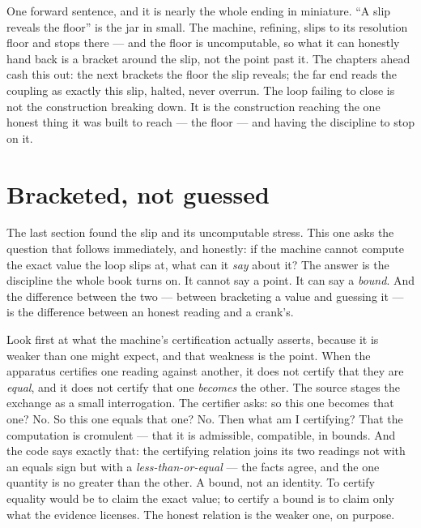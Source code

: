 One forward sentence, and it is nearly the whole ending in miniature. ``A slip reveals the floor'' is the jar in
small. The machine, refining, slips to its resolution floor and stops there --- and the floor is uncomputable, so what
it can honestly hand back is a bracket around the slip, not the point past it. The chapters ahead cash this out: the
next brackets the floor the slip reveals; the far end reads the coupling as exactly this slip, halted, never overrun.
The loop failing to close is not the construction breaking down. It is the construction reaching the one honest thing
it was built to reach --- the floor --- and having the discipline to stop on it.

\section{Bracketed, not guessed}

The last section found the slip and its uncomputable stress. This one asks the question that follows immediately, and
honestly: if the machine cannot compute the exact value the loop slips at, what can it \emph{say} about it? The answer
is the discipline the whole book turns on. It cannot say a point. It can say a \emph{bound}. And the difference between
the two --- between bracketing a value and guessing it --- is the difference between an honest reading and a crank's.

Look first at what the machine's certification actually asserts, because it is weaker than one might expect, and that
weakness is the point. When the apparatus certifies one reading against another, it does not certify that they are
\emph{equal}, and it does not certify that one \emph{becomes} the other. The source stages the exchange as a small
interrogation. The certifier asks: so this one becomes that one? No. So this one equals that one? No. Then what am I
certifying? That the computation is cromulent --- that it is admissible, compatible, in bounds. And the code says
exactly that: the certifying relation joins its two readings not with an equals sign but with a
\emph{less-than-or-equal} --- the facts agree, and the one quantity is no greater than the other. A bound, not an
identity. To certify equality would be to claim the exact value; to certify a bound is to claim only what the evidence
licenses. The honest relation is the weaker one, on purpose.

